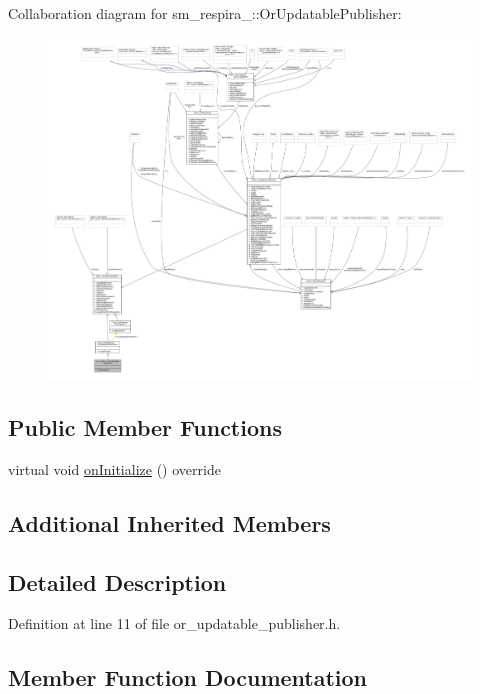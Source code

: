 Collaboration diagram for sm\+\_\+respira\+\_\+:\+:Or\+Updatable\+Publisher\+:
\nopagebreak
\begin{figure}[H]
\begin{center}
\leavevmode
\includegraphics[width=350pt]{classsm__respira__1_1_1OrUpdatablePublisher__coll__graph}
\end{center}
\end{figure}
\subsection*{Public Member Functions}
\begin{DoxyCompactItemize}
\item 
virtual void \hyperlink{classsm__respira__1_1_1OrUpdatablePublisher_a0ae110d830e583571fc79b4daa9d424d}{on\+Initialize} () override
\end{DoxyCompactItemize}
\subsection*{Additional Inherited Members}


\subsection{Detailed Description}


Definition at line 11 of file or\+\_\+updatable\+\_\+publisher.\+h.



\subsection{Member Function Documentation}
\mbox{\label{classsm__respira__1_1_1OrUpdatablePublisher_a0ae110d830e583571fc79b4daa9d424d}} 
